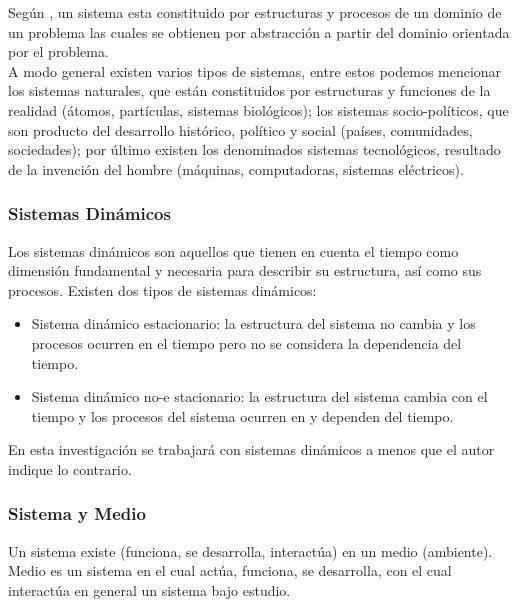 Según  \parencite{temasdesimulacion}, un sistema esta constituido por estructuras y procesos de un dominio de un problema las cuales se obtienen por abstracción a partir del dominio orientada por el problema.\\

A modo general existen varios tipos de sistemas, entre estos podemos mencionar los sistemas naturales, que están constituidos por estructuras y funciones de la realidad (átomos, partículas, sistemas biológicos); los sistemas socio-políticos, que son producto del desarrollo histórico, político y social (países, comunidades, sociedades); por último existen los denominados sistemas tecnológicos, resultado de la invención del hombre (máquinas, computadoras, sistemas eléctricos).\\

\subsubsection{Sistemas Dinámicos}

Los sistemas dinámicos son aquellos que tienen en cuenta el tiempo como dimensión fundamental y necesaria para describir su estructura, así como sus procesos. Existen dos tipos de sistemas dinámicos:
\begin{itemize}
	\item Sistema dinámico estacionario: la estructura del sistema no cambia y los procesos ocurren en el tiempo pero no se considera la dependencia del tiempo.
	\item Sistema dinámico no-e	stacionario: la estructura del sistema cambia con el tiempo y los procesos del sistema ocurren en y dependen del tiempo. \parencite{temasdesimulacion}
\end{itemize}

En esta investigación se trabajará con sistemas dinámicos a menos que el autor indique lo contrario.\\

\subsubsection{Sistema y Medio}

Un sistema existe (funciona, se desarrolla, interactúa) en un medio (ambiente). Medio es un sistema en el cual actúa, funciona, se desarrolla, con el cual interactúa en general un sistema bajo estudio. \parencite{temasdesimulacion}\\

